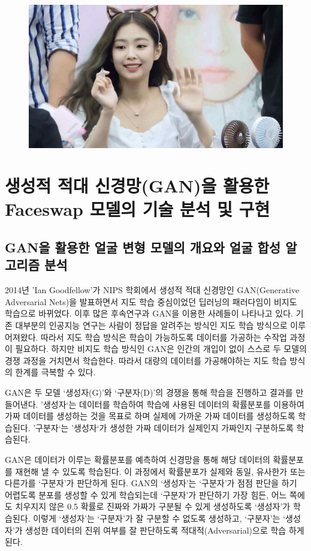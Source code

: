 \documentclass[chapter,oneside]{oblivoir}
\begin{document}
\begin{figure}[h!]
\centering
\includegraphics[scale = 0.5]{pic/chp4/img846}
\end{figure}

\chapter{ 생성적 적대 신경망(GAN)을 활용한 Faceswap 모델의 기술 분석 및 구현}


\section{ GAN을 활용한 얼굴 변형 모델의 개요와 얼굴 합성 알고리즘 분석}
2014년 'Ian Goodfellow'가 NIPS 학회에서 생성적 적대 신경망인 GAN(Generative Adversarial Nets)을 발표하면서 지도 학습 중심이었던 딥러닝의 패러다임이 비지도 학습으로 바뀌었다. 이후 많은 후속연구과 GAN을 이용한 사례들이 나타나고 있다. 기존 대부분의 인공지능 연구는 사람이 정답을 알려주는 방식인 지도 학습 방식으로 이루어져왔다. 따라서 지도 학습 방식은 학습이 가능하도록 데이터를 가공하는 수작업 과정이 필요하다. 하지만 비지도 학습 방식인 GAN은 인간의 개입이 없이 스스로 두 모델의 경쟁 과정을 거치면서 학습한다. 따라서 대량의 데이터를 가공해야하는 지도 학습 방식의 한계를 극복할 수 있다.

GAN은 두 모델 ‘생성자(G)’와 ‘구분자(D)’의 경쟁을 통해 학습을 진행하고 결과를 만들어낸다. '생성자‘는 데이터를 학습하여 학습에 사용된 데이터의 확률분포를 이용하여 가짜 데이터를 생성하는 것을 목표로 하며 실제에 가까운 가짜 데이터를 생성하도록 학습된다. ’구분자‘는 ’생성자‘가 생성한 가짜 데이터가 실제인지 가짜인지 구분하도록 학습된다.

GAN은 데이터가 이루는 확률분포를 예측하여 신경망을 통해 해당 데이터의 확률분포를 재현해 낼 수 있도록 학습된다. 이 과정에서 확률분포가 실제와 동일, 유사한가 또는 다른가를 ‘구분자’가 판단하게 된다. GAN의 ‘생성자’는 ‘구분자’가 점점 판단을 하기 어렵도록 분포를 생성할 수 있게 학습되는데 ‘구분자’가 판단하기 가장 힘든, 어느 쪽에도 치우지지 않은 0.5 확률로 진짜와 가짜가 구분될 수 있게 생성하도록 ‘생성자’가 학습된다. 이렇게 ‘생성자’는 ‘구분자’가 잘 구분할 수 없도록 생성하고, ‘구분자’는 ‘생성자’가 생성한 데이터의 진위 여부를 잘 판단하도록 적대적(Adversarial)으로 학습 하게 된다.
\end{document}
